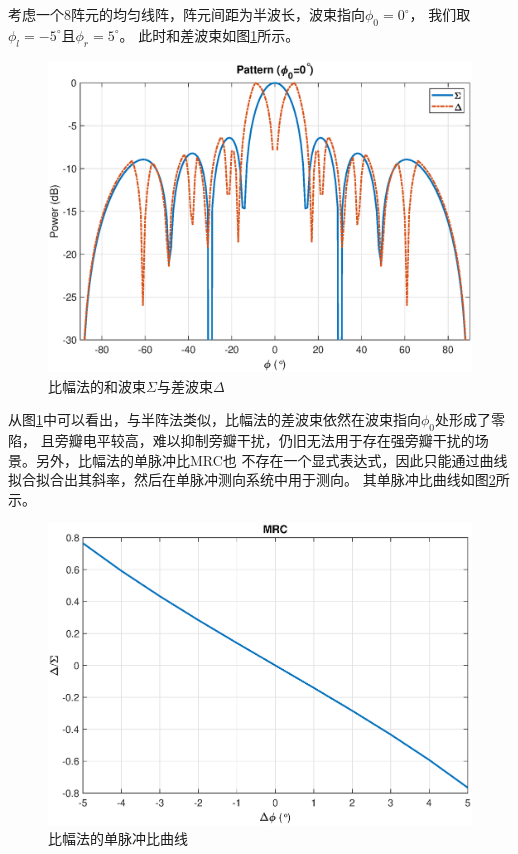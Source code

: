 \documentclass[master]{thesis-uestc}
\begin{document}
考虑一个$8$阵元的均匀线阵，阵元间距为半波长，波束指向$\phi_0=0^\circ$，
我们取$\phi_l=-5^\circ$且$\phi_r=5^\circ$。
此时和差波束如图\ref{ACM_sigma_delta}所示。
\begin{figure}[h]
    \includegraphics[scale=0.4]{pic/ACM_sigma_delta.eps}
    \caption{比幅法的和波束$\Sigma$与差波束$\Delta$}
    \label{ACM_sigma_delta}
\end{figure}

从图\ref{ACM_sigma_delta}中可以看出，与半阵法类似，比幅法的差波束依然在波束指向$\phi_0$处形成了零陷，
且旁瓣电平较高，难以抑制旁瓣干扰，仍旧无法用于存在强旁瓣干扰的场景。另外，比幅法的单脉冲比MRC也
不存在一个显式表达式，因此只能通过曲线拟合拟合出其斜率，然后在单脉冲测向系统中用于测向。
其单脉冲比曲线如图\ref{ACM_MRC}所示。
\begin{figure}[h]
    \includegraphics[scale=0.4]{pic/ACM_MRC.eps}
    \caption{比幅法的单脉冲比曲线}
    \label{ACM_MRC}
\end{figure}
\end{document}
